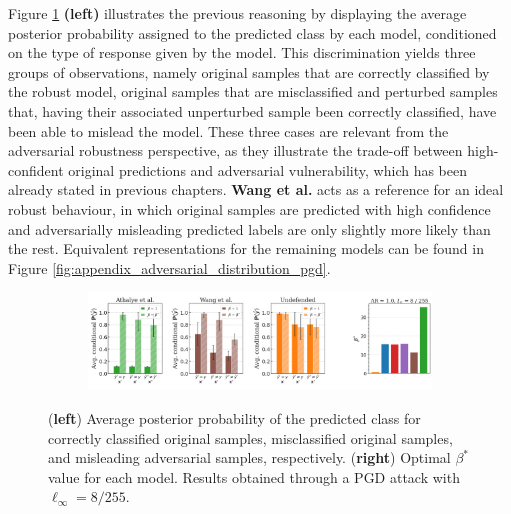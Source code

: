 Figure \ref{fig:unrobust_posterior_short_pgd} \textbf{(left)} illustrates
the previous reasoning by displaying the average posterior
probability assigned to the predicted class by each model, conditioned on the type
of response given by the model. This discrimination yields three groups of observations,
namely original samples that are correctly classified by the robust model, 
original samples that are misclassified and perturbed samples that, having their 
associated unperturbed sample been correctly classified, 
have been able to mislead the model. These three cases are relevant from the 
adversarial robustness perspective,  as they illustrate the trade-off between high-confident 
original predictions and adversarial vulnerability, which has been already stated in 
previous chapters. {\color{tab:brown} \textbf{Wang et al.}}
acts as a reference for an ideal robust behaviour, in which original samples are
predicted with high confidence and adversarially misleading predicted labels are 
only slightly more likely than the rest. Equivalent representations for the remaining
models can be found in Figure \ref{fig:appendix_adversarial_distribution_pgd}.\\

\begin{figure}[H]
    \centering
    \begin{subfigure}[b]{\textwidth}
        \centering
        \includegraphics[width=\textwidth]{img/results_discussion/adversarial/bpda_wang_undefended_beta_pgd.png}
    \end{subfigure}
   
    \caption{(\textbf{left}) Average posterior probability of the predicted class for 
    correctly classified original samples, misclassified original samples, and 
    misleading adversarial samples, respectively. (\textbf{right}) Optimal $\beta^{*}$ value for each model.
    Results obtained through a PGD attack with $\ell_\infty = 8 / 255$.}
    \label{fig:unrobust_posterior_short_pgd}
\end{figure}


